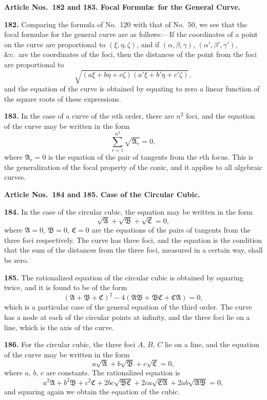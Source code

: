 \documentclass[12pt,a4paper]{article}
\theoremstyle{definition}
\begin{document}
\vspace{0.5em}
\noindent\textbf{Article Nos.~182 and 183. Focal Formul\ae\ for the General Curve.}

\vspace{0.3em}
\noindent\textbf{182.} Comparing the formula of No.~120 with that of No.~50, we see that
the focal formulae for the general curve are as follows:---If the coordinates of a point
on the curve are proportional to $(\xi, \eta, \zeta)$, and if $(\alpha, \beta, \gamma)$, $(\alpha', \beta', \gamma')$, \&c.\ are the coordinates
of the foci, then the distances of the point from the foci are proportional to
\[
\sqrt{(a\xi + b\eta + c\zeta)(a'\xi + b'\eta + c'\zeta)},
\]
and the equation of the curve is obtained by equating to zero a linear function of the
square roots of these expressions.

\newpage
\noindent\textbf{183.} In the case of a curve of the $n$th order, there are $n^2$ foci, and the
equation of the curve may be written in the form
\[
\sum_{r=1}^{n^2} \sqrt{\mathfrak{A}_r} = 0,
\]
where $\mathfrak{A}_r = 0$ is the equation of the pair of tangents from the $r$th focus. This is the
generalization of the focal property of the conic, and it applies to all algebraic curves.

\vspace{0.5em}
\noindent\textbf{Article Nos.~184 and 185. Case of the Circular Cubic.}

\vspace{0.3em}
\noindent\textbf{184.} In the case of the circular cubic, the equation may be written in the form
\[
\sqrt{\mathfrak{A}} + \sqrt{\mathfrak{B}} + \sqrt{\mathfrak{C}} = 0,
\]
where $\mathfrak{A} = 0$, $\mathfrak{B} = 0$, $\mathfrak{C} = 0$ are the equations of the pairs of tangents from the three foci
respectively. The curve has three foci, and the equation is the condition that the sum
of the distances from the three foci, measured in a certain way, shall be zero.

\noindent\textbf{185.} The rationalized equation of the circular cubic is obtained by squaring
twice, and it is found to be of the form
\[
(\mathfrak{A} + \mathfrak{B} + \mathfrak{C})^2 - 4(\mathfrak{A}\mathfrak{B} + \mathfrak{B}\mathfrak{C} + \mathfrak{C}\mathfrak{A}) = 0,
\]
which is a particular case of the general equation of the third order. The curve has
a node at each of the circular points at infinity, and the three foci lie on a line, which
is the axis of the curve.

\newpage
\noindent\textbf{186.} For the circular cubic, the three foci $A$, $B$, $C$ lie on a line, and the
equation of the curve may be written in the form
\[
a\sqrt{\mathfrak{A}} + b\sqrt{\mathfrak{B}} + c\sqrt{\mathfrak{C}} = 0,
\]
where $a$, $b$, $c$ are constants. The rationalized equation is
\[
a^2\mathfrak{A} + b^2\mathfrak{B} + c^2\mathfrak{C} + 2bc\sqrt{\mathfrak{B}\mathfrak{C}} + 2ca\sqrt{\mathfrak{C}\mathfrak{A}} + 2ab\sqrt{\mathfrak{A}\mathfrak{B}} = 0,
\]
and squaring again we obtain the equation of the cubic.
\end{document}
